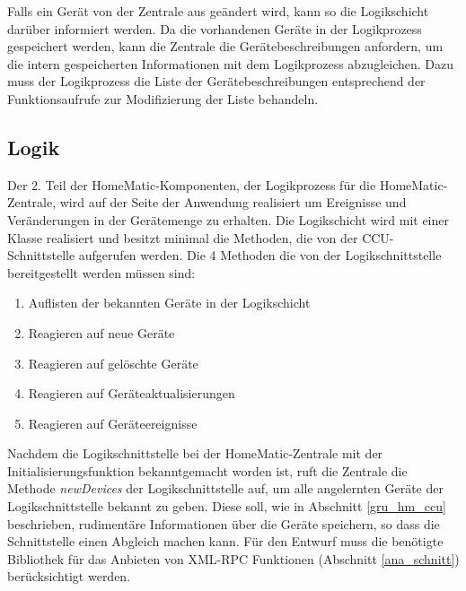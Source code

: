 Falls ein Gerät von der Zentrale aus geändert wird, kann so die Logikschicht
darüber informiert werden.
Da die vorhandenen Geräte in der Logikprozess gespeichert werden, kann die Zentrale
die Gerätebeschreibungen anfordern, um die intern gespeicherten Informationen mit
dem Logikprozess abzugleichen.
Dazu muss der Logikprozess die Liste der Gerätebeschreibungen entsprechend der
Funktionsaufrufe zur Modifizierung der Liste behandeln.

\subsection{Logik}
\label{des_hm_logic}
Der 2. Teil der HomeMatic-Komponenten, der Logikprozess für die HomeMatic-Zentrale, wird auf der
Seite der Anwendung realisiert um Ereignisse und Veränderungen in der Gerätemenge zu erhalten.
Die Logikschicht wird mit einer Klasse realisiert und besitzt minimal die Methoden, die
von der CCU-Schnittstelle aufgerufen werden.
Die 4 Methoden die von der Logikschnittstelle bereitgestellt werden müssen sind:
\begin{enumerate}
\item Auflisten der bekannten Geräte in der Logikschicht
\item Reagieren auf neue Geräte
\item Reagieren auf gelöschte Geräte
\item Reagieren auf Geräteaktualisierungen
\item Reagieren auf Geräteereignisse
\end{enumerate}
Nachdem die Logikschnittstelle bei der HomeMatic-Zentrale mit der Initialisierungsfunktion
bekanntgemacht worden ist, ruft die Zentrale die Methode \emph{newDevices} der Logikschnittstelle
auf, um alle angelernten Geräte der Logikschnittstelle bekannt zu geben.
Diese soll, wie in Abschnitt \ref{gru_hm_ccu} beschrieben, rudimentäre Informationen über die Geräte
speichern, so dass die Schnittstelle einen Abgleich machen kann.
Für den Entwurf muss die benötigte Bibliothek für das Anbieten von XML-RPC Funktionen
(Abschnitt \ref{ana_schnitt}) berücksichtigt werden.



